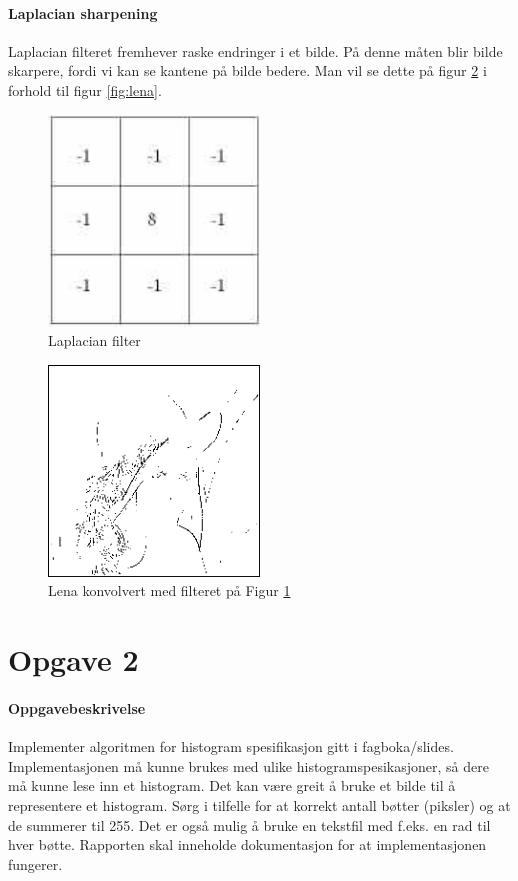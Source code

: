 \documentclass[a4paper, 12pt]{article}
\begin{document}
\paragraph{Laplacian sharpening}
Laplacian filteret fremhever raske endringer i et bilde. På denne måten blir bilde skarpere, fordi vi kan se kantene på bilde bedere. Man vil se dette på figur \ref{fig:lena-laplacian} i forhold til figur \ref{fig:lena}.

\begin{figure}[h]
  \centering
  \includegraphics[width=0.5\textwidth]{images/laplacian-filter}
  \caption{Laplacian filter}
  \label{fig:laplacian-filter}
\end{figure}

\begin{figure}[h]
  \centering
  \includegraphics[width=0.5\textwidth]{images/laplacian-lena}
  \caption{Lena konvolvert med filteret på Figur \ref{fig:laplacian-filter}}
  \label{fig:lena-laplacian}
\end{figure}

\section{Opgave 2}
\paragraph{Oppgavebeskrivelse}
Implementer algoritmen for histogram spesifikasjon gitt i fagboka/slides. Implementasjonen må kunne brukes med ulike histogramspesikasjoner, så
dere må kunne lese inn et histogram. Det kan være greit å bruke et bilde til å representere et histogram. Sørg i tilfelle for at korrekt antall bøtter (piksler) og at de summerer til 255. Det er også mulig å bruke en tekstfil med f.eks. en rad til hver bøtte. Rapporten skal inneholde dokumentasjon for at implementasjonen fungerer.
\end{document}
